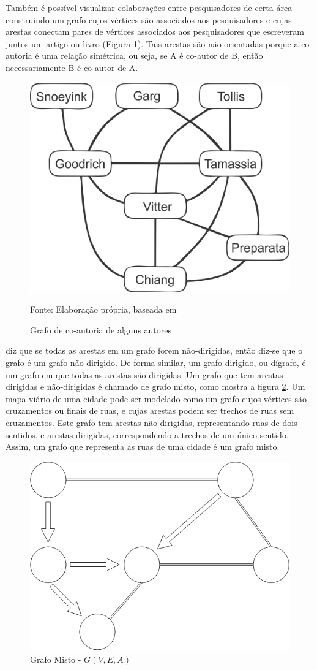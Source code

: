 Também é possível visualizar colaborações entre pesquisadores de certa área construindo um grafo cujos vértices são
associados aos pesquisadores e cujas arestas conectam pares de vértices associados aos pesquisadores
que escreveram juntos um artigo ou livro (Figura \ref{fig:goodrich}). Tais arestas são não-orientadas porque
a co-autoria é uma relação simétrica, ou seja, se A é co-autor de B, então necessariamente B é co-autor de A.

\begin{figure}[htbp]
\centering
 \includegraphics[width=.35\textwidth]{chapters/fig/goodrich.png}
\caption{Grafo de co-autoria de alguns autores}
Fonte: Elaboração própria, baseada em \cite{goodrich}
\label{fig:goodrich}
\end{figure}
\FloatBarrier


\cite{goodrich} diz que se todas as arestas em um grafo forem não-dirigidas,
então diz-se que o grafo é um grafo não-dirigido. De forma similar, um grafo dirigido, ou dígrafo, é um grafo em
que todas as arestas são dirigidas. Um grafo que tem arestas dirigidas e não-dirigidas é chamado de grafo misto, 
como mostra a figura \ref{fig:misto}.
Um mapa viário de uma cidade pode ser modelado como um grafo cujos vértices são cruzamentos ou finais de ruas, e cujas arestas
podem ser trechos de ruas sem cruzamentos. Este grafo tem arestas não-dirigidas, representando ruas de dois sentidos,
e arestas dirigidas, correspondendo a trechos de um único sentido. Assim, um grafo que representa as ruas de uma cidade
é um grafo misto.

\begin{figure}[htbp]
\centering
 \includegraphics[width=.35\textwidth]{chapters/fig/misto1.png}
\caption{Grafo Misto - $G(V,E,A)$}
\label{fig:misto}
\end{figure}

